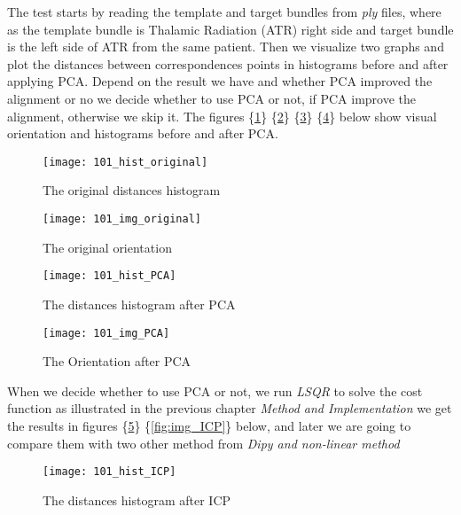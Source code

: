 \documentclass[../structure.tex]{subfiles}
\begin{document}
The test starts by reading the template and target bundles from \textit{ply} files, where as the template bundle is Thalamic Radiation (ATR) right side and target bundle is the left side of ATR from the same patient. Then we visualize two graphs and plot the distances between correspondences points in histograms before and after applying PCA. Depend on the result we have and whether PCA improved the alignment or no we decide whether to use PCA or not, if PCA improve the alignment, otherwise we skip it. The figures \{\ref{fig:hist_original}\} \{\ref{fig:img_original}\} \{\ref{fig:hist_PCA}\} \{\ref{fig:img_PCA}\} below show visual orientation and histograms before and after PCA.

\begin{figure}[h!]
\centering
\texttt{[image: 101\_hist\_original]}
\captionsetup{justification=centering}
\caption{The original distances histogram}
\label{fig:hist_original}
\end{figure}

\begin{figure}[h!]
\centering
\texttt{[image: 101\_img\_original]}
\captionsetup{justification=centering}
\caption{The original orientation}
\label{fig:img_original}
\end{figure}
\pagebreak
\begin{figure}[h!]
\centering
\texttt{[image: 101\_hist\_PCA]}
\captionsetup{justification=centering}
\caption{The distances histogram after PCA}
\label{fig:hist_PCA}
\end{figure}

\begin{figure}[h!]
\centering
\texttt{[image: 101\_img\_PCA]}
\captionsetup{justification=centering}
\caption{The Orientation after PCA}
\label{fig:img_PCA}
\end{figure}
\pagebreak
When we decide whether to use PCA or not, we run \textit{LSQR} to solve the cost function as illustrated in the previous chapter \textit{Method and Implementation} we get the results in figures \{\ref{fig:hist_ICP}\} \{\ref{fig:img_ICP}\} below, and later we are going to compare them with two other method from \textit{Dipy and non-linear method}

\begin{figure}[h!]
\centering
\texttt{[image: 101\_hist\_ICP]}
\captionsetup{justification=centering}
\caption{The distances histogram after ICP}
\label{fig:hist_ICP}
\end{figure}
\end{document}
